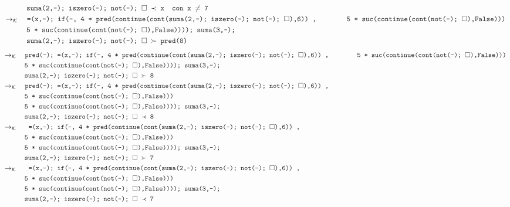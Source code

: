 \documentclass{article}
\newcommand{\tx}[1]{\textcolor{Black} {\texttt{#1}}}
\newcommand{\es}{$\square$}
\newcommand{\kr}{\rightarrow_{\mathcal{K}} \quad}
\begin{document}
\begin{enumerate}
\begin{enumerate}
\begin{align*}
			&\tx{\quad \quad \quad suma(2,-); iszero(-); not(-); \es $\ \prec $ x} \tx{\quad con x $\neq$ 7}\\	
			&\kr \tx{=(x,-); if(-, 4 * pred(continue(cont(suma(2,-); iszero(-); not(-); \es),6)) ,}
			&\tx{\quad \quad \quad 5 * suc(continue(cont(not(-); \es),False)))}\\
			&\tx {\quad \quad \quad 5 * suc(continue(cont(not(-); \es),False)))); suma(3,-);}\\
			&\tx{\quad \quad \quad suma(2,-); iszero(-); not(-); \es $\ \succ $ pred(8)} \\
			\end{align*}
			\begin{align*}
			&\kr \tx{pred(-); =(x,-); if(-, 4 * pred(continue(cont(suma(2,-); iszero(-); not(-); \es),6)) ,}
			&\tx{\quad \quad \quad 5 * suc(continue(cont(not(-); \es),False)))}\\
			&\tx {\quad \quad \quad 5 * suc(continue(cont(not(-); \es),False)))); suma(3,-);}\\
			&\tx{\quad \quad \quad suma(2,-); iszero(-); not(-); \es $\ \succ $ 8} \\
			&\kr \tx{pred(-); =(x,-); if(-, 4 * pred(continue(cont(suma(2,-); iszero(-); not(-); \es),6)) ,}\\
			&\tx{\quad \quad \quad 5 * suc(continue(cont(not(-); \es),False)))}\\
			&\tx {\quad \quad \quad 5 * suc(continue(cont(not(-); \es),False)))); suma(3,-);}\\
			&\tx{\quad \quad \quad suma(2,-); iszero(-); not(-); \es $\ \prec $ 8} \\
			&\kr \tx{ =(x,-); if(-, 4 * pred(continue(cont(suma(2,-); iszero(-); not(-); \es),6)) ,}\\
			&\tx{\quad \quad \quad 5 * suc(continue(cont(not(-); \es),False)))}\\
			&\tx {\quad \quad \quad 5 * suc(continue(cont(not(-); \es),False)))); suma(3,-);}\\
			&\tx{\quad \quad \quad suma(2,-); iszero(-); not(-); \es $\ \succ $ 7} \\
			&\kr \tx{ =(x,-); if(-, 4 * pred(continue(cont(suma(2,-); iszero(-); not(-); \es),6)) ,}\\
			&\tx{\quad \quad \quad 5 * suc(continue(cont(not(-); \es),False)))}\\
			&\tx {\quad \quad \quad 5 * suc(continue(cont(not(-); \es),False)))); suma(3,-);}\\
			&\tx{\quad \quad \quad suma(2,-); iszero(-); not(-); \es $\ \prec $ 7} \\

\end{align*}
\end{enumerate}
\end{enumerate}
\end{document}
